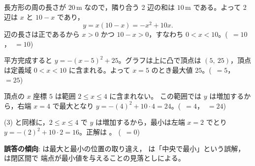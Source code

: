 \documentclass[common-test]{manabi}
\begin{document}
\begin{mnbparts}
  \item 長方形の周の長さが $20\,\mathrm{m}$ なので，隣り合う 2 辺の和は
    $10\,\mathrm{m}$ である。よって 2 辺は $x$ と $10 - x$ であり，
    \[
      y = x(10 - x) = -x^2 + 10x.
    \]
    辺の長さは正であるから $x > 0$ かつ $10 - x > 0$，すなわち
    $0 < x < 10$。\quad\mbox{( $= 10$， $= 10$)}

  \item 平方完成すると $y = -(x - 5)^2 + 25$。グラフは上に凸で頂点は
    $(5,\ 25)$，頂点は定義域 $0 < x < 10$ に含まれる。よって
    $x = 5$ のとき最大値 $25$。\quad\mbox{( $= 5$， $= 25$)}

  \item 頂点の $x$ 座標 $5$ は範囲 $2 \le x \le 4$ に含まれない。
    この範囲では $y$ は増加するから，右端 $x = 4$ で最大となり
    $y = -(4)^2 + 10 \cdot 4 = 24$。\quad\mbox{( $= 4$， $= 24$)}

  \item (3) と同様に，$2 \le x \le 4$ で $y$ は増加するから，最小は左端
    $x = 2$ でとり $y = -(2)^2 + 10 \cdot 2 = 16$。正解は 。
    \quad\mbox{( $= 0$)}

    \textbf{誤答の傾向}:  は最大と最小の位置の取り違え，
     は「中央で最小」という誤解， は閉区間で
    端点が最小値を与えることの見落としによる。
\end{mnbparts}
\end{document}
